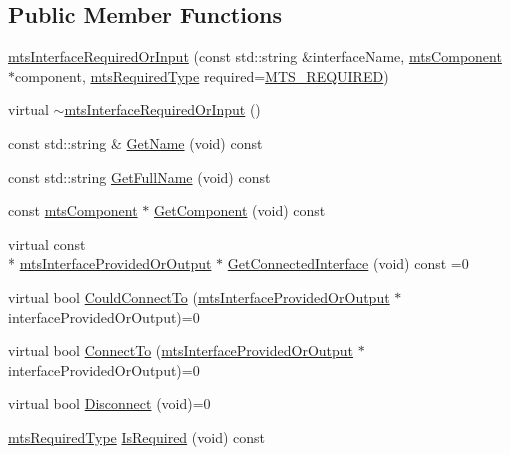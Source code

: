 \subsection*{Public Member Functions}
\begin{DoxyCompactItemize}
\item 
\hyperlink{classmts_interface_required_or_input_a5529989a70a76236d4e3570a6bf54442}{mts\-Interface\-Required\-Or\-Input} (const std\-::string \&interface\-Name, \hyperlink{classmts_component}{mts\-Component} $\ast$component, \hyperlink{mts_forward_declarations_8h_a9ef1ce54724afde7802db326ff8606f3}{mts\-Required\-Type} required=\hyperlink{mts_forward_declarations_8h_a9ef1ce54724afde7802db326ff8606f3ae01fd85391b60e546bbb1be9716c4ec9}{M\-T\-S\-\_\-\-R\-E\-Q\-U\-I\-R\-E\-D})
\item 
virtual \hyperlink{classmts_interface_required_or_input_aa9bc3cd4a8433df079e0adb2d2e472f5}{$\sim$mts\-Interface\-Required\-Or\-Input} ()
\item 
const std\-::string \& \hyperlink{classmts_interface_required_or_input_a9d8d6d995d2ec8dd155601964c8524ac}{Get\-Name} (void) const 
\item 
const std\-::string \hyperlink{classmts_interface_required_or_input_a1668fe8e128e77cceb33fd4ce8a053c3}{Get\-Full\-Name} (void) const 
\item 
const \hyperlink{classmts_component}{mts\-Component} $\ast$ \hyperlink{classmts_interface_required_or_input_af1f2fff7a84b86d7f3875e686247342a}{Get\-Component} (void) const 
\item 
virtual const \\*
\hyperlink{classmts_interface_provided_or_output}{mts\-Interface\-Provided\-Or\-Output} $\ast$ \hyperlink{classmts_interface_required_or_input_ac552961d38b4c5f03ba32771931083a6}{Get\-Connected\-Interface} (void) const =0
\item 
virtual bool \hyperlink{classmts_interface_required_or_input_abd19efe04fddce22bd751488f89cc34b}{Could\-Connect\-To} (\hyperlink{classmts_interface_provided_or_output}{mts\-Interface\-Provided\-Or\-Output} $\ast$interface\-Provided\-Or\-Output)=0
\item 
virtual bool \hyperlink{classmts_interface_required_or_input_ac156fd8b187afa072f59d13c6e775787}{Connect\-To} (\hyperlink{classmts_interface_provided_or_output}{mts\-Interface\-Provided\-Or\-Output} $\ast$interface\-Provided\-Or\-Output)=0
\item 
virtual bool \hyperlink{classmts_interface_required_or_input_a8c7c1b7c1914444225f16f0900784717}{Disconnect} (void)=0
\item 
\hyperlink{mts_forward_declarations_8h_a9ef1ce54724afde7802db326ff8606f3}{mts\-Required\-Type} \hyperlink{classmts_interface_required_or_input_a59397ab0b1f8234f525ebe3e010599e6}{Is\-Required} (void) const 
\end{DoxyCompactItemize}
